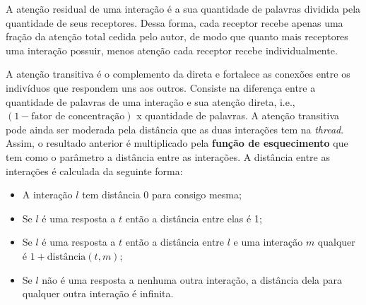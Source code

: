A atenção residual de uma interação é a sua quantidade de palavras dividida pela
quantidade de seus receptores. Dessa forma, cada receptor recebe apenas uma
fração da atenção total cedida pelo autor, de modo que quanto mais receptores
uma interação possuir, menos atenção cada receptor recebe individualmente.

A atenção transitiva é o complemento da direta e fortalece as conexões entre os
indivíduos que respondem uns aos outros. Consiste na diferença entre a
quantidade de palavras de uma interação e sua atenção direta, i.e., $(1 -
\text{fator de concentração})$ x quantidade de palavras. A atenção transitiva
pode ainda ser moderada pela distância que as duas interações tem na
\emph{thread}. Assim, o resultado anterior é multiplicado pela \textbf{função de
esquecimento} que tem como o parâmetro a distância entre as interações. A
distância entre as interações é calculada da seguinte forma:

\begin{itemize}
  \item A interação $l$ tem distância 0 para consigo mesma;
  \item Se $l$ é uma resposta a $t$ então a distância entre elas é 1;
  \item Se $l$ é uma resposta a $t$ então a distância entre $l$ e uma interação
  $m$ qualquer é $1 + \text{distância}(t, m)$;
  \item Se $l$ não é uma resposta a nenhuma outra interação, a distância dela
  para qualquer outra interação é infinita.
\end{itemize}

